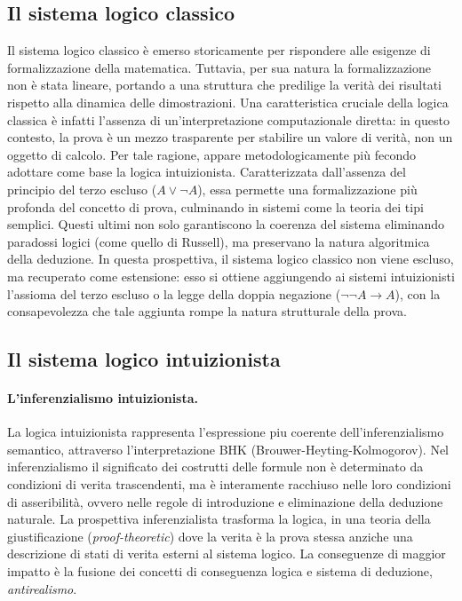 \subsection{Il sistema logico classico}
Il sistema logico classico è emerso storicamente per rispondere alle esigenze di formalizzazione della matematica. Tuttavia, per sua natura la formalizzazione non è stata lineare, portando a una 
struttura che predilige la verità dei risultati rispetto alla dinamica delle dimostrazioni. Una caratteristica cruciale della logica classica è infatti l'assenza di un'interpretazione computazionale 
diretta: in questo contesto, la prova è un mezzo trasparente per stabilire un valore di verità, non un oggetto di calcolo. Per tale ragione, appare metodologicamente più fecondo adottare come base 
la logica intuizionista. Caratterizzata dall'assenza del principio del terzo escluso ($A \vee \neg A$), essa permette una formalizzazione più profonda del concetto di prova, culminando in sistemi 
come la teoria dei tipi semplici. Questi ultimi non solo garantiscono la coerenza del sistema eliminando paradossi logici (come quello di Russell), ma preservano la natura algoritmica della deduzione. 
In questa prospettiva, il sistema logico classico non viene escluso, ma recuperato come estensione: esso si ottiene aggiungendo ai sistemi intuizionisti l'assioma del terzo escluso o la legge della 
doppia negazione ($\neg \neg A \to A$), con la consapevolezza che tale aggiunta rompe la natura strutturale della prova.

\subsection{Il sistema logico intuizionista}

\paragraph{L'inferenzialismo intuizionista.}
La logica intuizionista rappresenta l'espressione piu coerente dell'inferenzialismo semantico, attraverso l'interpretazione BHK (Brouwer-Heyting-Kolmogorov). Nel inferenzialismo
il significato dei costrutti delle formule non è determinato da condizioni di verita trascendenti, ma è interamente racchiuso nelle loro condizioni di asseribilità, ovvero
nelle regole di introduzione e eliminazione della deduzione naturale. La prospettiva inferenzialista trasforma la logica, in una teoria della giustificazione (\emph{proof-theoretic}) 
dove la verita è la prova stessa anziche una descrizione di stati di verita esterni al sistema logico. La conseguenze di maggior impatto è la fusione  dei concetti di conseguenza logica
e sistema di deduzione, \emph{antirealismo}. 

